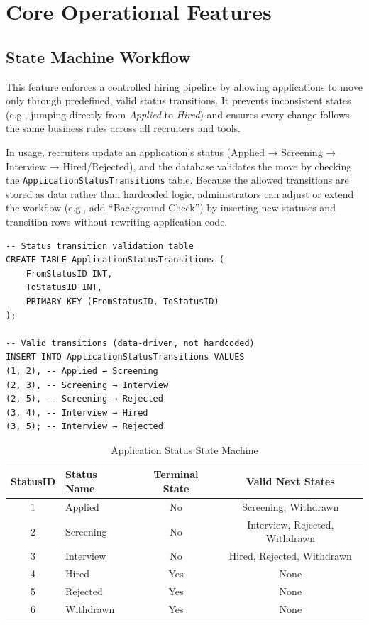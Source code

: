 \documentclass[11pt,a4paper]{article}
\begin{document}
\section{Core Operational Features}

\subsection{State Machine Workflow}

\noindent
This feature enforces a controlled hiring pipeline by allowing applications to move only through predefined, valid status transitions. It prevents inconsistent states (e.g., jumping directly from \textit{Applied} to \textit{Hired}) and ensures every change follows the same business rules across all recruiters and tools.

In usage, recruiters update an application’s status (Applied → Screening → Interview → Hired/Rejected), and the database validates the move by checking the \texttt{ApplicationStatusTransitions} table. Because the allowed transitions are stored as data rather than hardcoded logic, administrators can adjust or extend the workflow (e.g., add “Background Check”) by inserting new statuses and transition rows without rewriting application code.


\begin{verbatim}
-- Status transition validation table
CREATE TABLE ApplicationStatusTransitions (
    FromStatusID INT,
    ToStatusID INT,
    PRIMARY KEY (FromStatusID, ToStatusID)
);

-- Valid transitions (data-driven, not hardcoded)
INSERT INTO ApplicationStatusTransitions VALUES 
(1, 2), -- Applied → Screening
(2, 3), -- Screening → Interview
(2, 5), -- Screening → Rejected
(3, 4), -- Interview → Hired
(3, 5); -- Interview → Rejected
\end{verbatim}

\begin{table}[H]
    \centering
    \begin{tabular}{|c|l|c|c|}
        \hline
        \rowcolor{tableheader}
        \textbf{StatusID} & \textbf{Status Name} & \textbf{Terminal State} & \textbf{Valid Next States} \\
        \hline
        1 & Applied & No & Screening, Withdrawn \\
        \hline
        2 & Screening & No & Interview, Rejected, Withdrawn \\
        \hline
        3 & Interview & No & Hired, Rejected, Withdrawn \\
        \hline
        4 & Hired & Yes & None \\
        \hline
        5 & Rejected & Yes & None \\
        \hline
        6 & Withdrawn & Yes & None \\
        \hline
    \end{tabular}
    \caption{Application Status State Machine}
\end{table}
\end{document}
